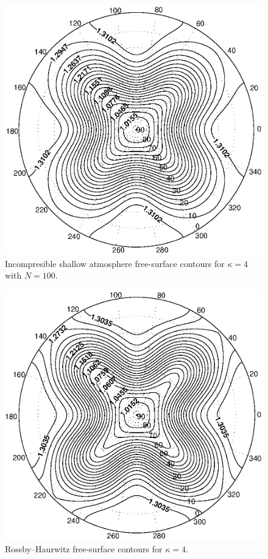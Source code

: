 \begin{figure}[htbp]
	\centering
		\includegraphics[scale=0.75]{IMAGES/swfsconts.eps}
	\caption{Incompresible shallow atmosphere free-surface contours for $\kappa=4$ with $N=100$.}
	\label{fig:swfsconts}
\end{figure}
\begin{figure}[htbp]
	\centering
		\includegraphics[scale=0.75]{IMAGES/rhfsconts.eps}
	\caption{Rossby--Haurwitz free-surface contours for $\kappa=4$.}
	\label{fig:rhfsconts}
\end{figure}

